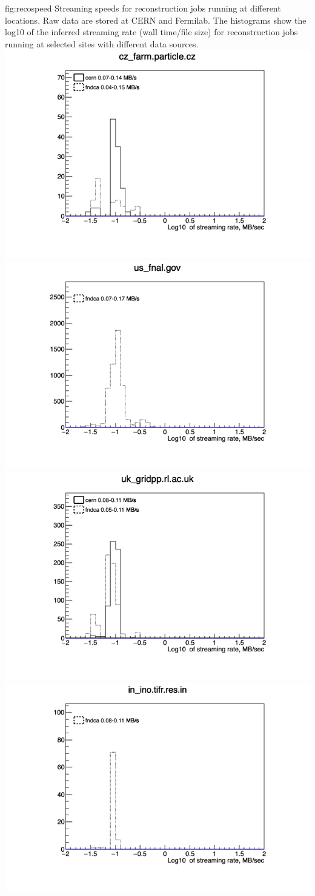 \documentclass[../main-v1.tex]{subfiles}
\begin{document}
\begin{dunefigure}
{fig:recospeed} 
{Streaming speeds for reconstruction jobs running at different locations. Raw data are stored at CERN and Fermilab.  The histograms show the log10 of the inferred streaming rate (wall time/file size) for reconstruction jobs running at selected sites with different data sources.}
\includegraphics[width=0.45 \textwidth]{graphics/Workflow/dune_slow_2021_01_01_2021_04_30_0_cz_farm.particle.cz.png}
\includegraphics[width=0.45 \textwidth]{graphics/Workflow/dune_slow_2021_01_01_2021_04_30_0_us_fnal.gov.png}
\includegraphics[width=0.45 \textwidth]{graphics/Workflow/dune_slow_2021_01_01_2021_04_30_0_uk_gridpp.rl.ac.uk.png}
\includegraphics[width=0.45 \textwidth]{graphics/Workflow/dune_slow_2021_01_01_2021_04_30_0_in_ino.tifr.res.in.png}
\end{dunefigure}
\end{document}
